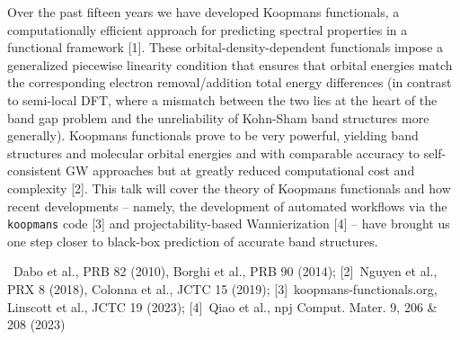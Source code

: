 \documentclass{scdpg}
\begin{document}
\begin{scAbstract}
\scBeginText
Over the past fifteen years we have developed Koopmans functionals, a computationally efficient approach for predicting spectral properties in a functional framework [1]. These orbital-density-dependent functionals impose a generalized piecewise linearity condition that ensures that orbital energies match the corresponding electron removal/addition total energy differences (in contrast to semi-local DFT, where a mismatch between the two lies at the heart of the band gap problem and the unreliability of Kohn-Sham band structures more generally). Koopmans functionals prove to be very powerful, yielding band structures and molecular orbital energies and with comparable accuracy to self-consistent GW approaches but at greatly reduced computational cost and complexity [2]. This talk will cover the theory of Koopmans functionals and how recent developments -- namely, the development of automated workflows via the \texttt{koopmans} code [3] and projectability-based Wannierization [4] -- have brought us one step closer to black-box prediction of accurate band structures.

\noindent [1]~Dabo et al., PRB 82 (2010), Borghi et al., PRB 90 (2014); [2]~Nguyen et al., PRX 8 (2018), Colonna et al., JCTC 15 (2019); [3]~koopmans-functionals.org, Linscott et al., JCTC 19 (2023); [4]~Qiao et al., npj Comput. Mater. 9, 206 \& 208 (2023)
\scEndText
{}
\end{scAbstract}
\end{document}
